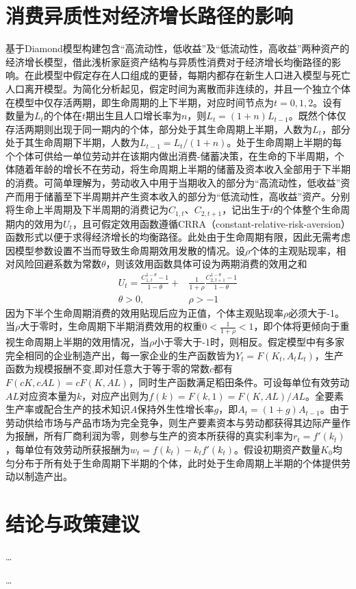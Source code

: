 \documentclass[supercite]{HustGraduPaper}
\begin{document}
    \section{消费异质性对经济增长路径的影响}
    基于Diamond模型构建包含“高流动性，低收益”及“低流动性，高收益”两种资产的经济增长模型，借此浅析家庭资产结构与异质性消费对于经济增长均衡路径的影响。在此模型中假定存在人口组成的更替，每期内都存在新生人口进入模型与死亡人口离开模型。为简化分析起见，假定时间为离散而非连续的，并且一个独立个体在模型中仅存活两期，即生命周期的上下半期，对应时间节点为$t=0,1,2$。设有数量为$L_{t}$的个体在$t$期出生且人口增长率为$n$，则$L_{t}=(1+n)L_{t-1}$。既然个体仅存活两期则出现于同一期内的个体，部分处于其生命周期上半期，人数为$L_{t}$，部分处于其生命周期下半期，人数为$L_{t-1}=L_{t}/(1+n)$。处于生命周期上半期的每个个体可供给一单位劳动并在该期内做出消费-储蓄决策，在生命的下半周期，个体随着年龄的增长不在劳动，将生命周期上半期的储蓄及资本收入全部用于下半期的消费。可简单理解为，劳动收入中用于当期收入的部分为“高流动性，低收益”资产而用于储蓄至下半周期并产生资本收入的部分为“低流动性，高收益”资产。分别将生命上半周期及下半周期的消费记为$C_{1,t}$、$C_{2,t+1}$，记出生于$t$的个体整个生命周期内的效用为$U_{t}$，且可假定效用函数遵循CRRA（constant-relative-risk-aversion）函数形式以便于求得经济增长的均衡路径。此处由于生命周期有限，因此无需考虑因模型参数设置不当而导致生命周期效用发散的情况。设$\rho$个体的主观贴现率，相对风险回避系数为常数$\theta$，则该效用函数具体可设为两期消费的效用之和
    \begin{equation}
    \begin{aligned}
    U_{t}=\frac{C_{1,t}^{1-\theta}-1}{1-\theta}+&\frac{1}{1+\rho}\frac{C_{2,t+1}^{1-\theta}-1}{1-\theta}\\
    \theta>0,\qquad & \rho>-1
    \end{aligned}
    \end{equation}
    因为下半个生命周期消费的效用贴现后应为正值，个体主观贴现率$\rho$必须大于-1。当$\rho$大于零时，生命周期下半期消费效用的权重$0<\frac{1}{1+\rho}<1$，即个体将更倾向于重视生命周期上半期的效用情况，当$\rho$小于零大于-1时，则相反。假定模型中有多家完全相同的企业制造产出，每一家企业的生产函数皆为$Y_{t}=F(K_{t},A_{t}L_{t})$，生产函数为规模报酬不变,即对任意大于等于零的常数$c$都有$F(cK,cAL)=cF(K,AL)$，同时生产函数满足稻田条件。可设每单位有效劳动$AL$对应资本量为$k$，对应产出则为$f(k)=F(k,1)=F(K,AL)/AL$。全要素生产率或配合生产的技术知识$A$保持外生性增长率$g$，即$A_{t}=(1+g)A_{t-1}$。由于劳动供给市场与产品市场为完全竞争，则生产要素资本与劳动都获得其边际产量作为报酬，所有厂商利润为零，则参与生产的资本所获得的真实利率为$r_t=f'(k_t)$，每单位有效劳动所获报酬为$w_t=f(k_t)-k_tf'(k_t)$。假设初期资产数量$K_0$均匀分布于所有处于生命周期下半期的个体，此时处于生命周期上半期的个体提供劳动以制造产出。
    
    \section{结论与政策建议}
    \ldots
    
    \begin{thankpage}
    \ldots
    \end{thankpage}

    
    
\end{document}
